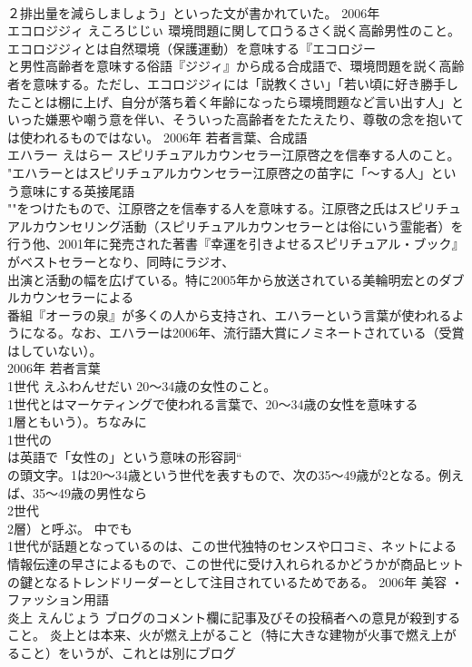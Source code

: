 \documentclass[8pt]{extreport}
\begin{document}
\begin{CJK}{UTF8}{min}
\\	２排出量を減らしましょう」といった文が書かれていた。	2006年	
\\	エコロジジィ	えころじじぃ	環境問題に関して口うるさく説く高齢男性のこと。	エコロジジィとは自然環境（保護運動）を意味する『エコロジー
\\	と男性高齢者を意味する俗語『ジジィ』から成る合成語で、環境問題を説く高齢者を意味する。ただし、エコロジジィには「説教くさい」「若い頃に好き勝手したことは棚に上げ、自分が落ち着く年齢になったら環境問題など言い出す人」といった嫌悪や嘲う意を伴い、そういった高齢者をたたえたり、尊敬の念を抱いては使われるものではない。	2006年	若者言葉、合成語	
\\	エハラー	えはらー	スピリチュアルカウンセラー江原啓之を信奉する人のこと。	"エハラーとはスピリチュアルカウンセラー江原啓之の苗字に「～する人」という意味にする英接尾語
\\	""をつけたもので、江原啓之を信奉する人を意味する。江原啓之氏はスピリチュアルカウンセリング活動（スピリチュアルカウンセラーとは俗にいう霊能者）を行う他、2001年に発売された著書『幸運を引きよせるスピリチュアル・ブック』がベストセラーとなり、同時にラジオ、
\\	出演と活動の幅を広げている。特に2005年から放送されている美輪明宏とのダブルカウンセラーによる
\\	番組『オーラの泉』が多くの人から支持され、エハラーという言葉が使われるようになる。なお、エハラーは2006年、流行語大賞にノミネートされている（受賞はしていない）。
\\	2006年	若者言葉	
\\	1世代	えふわんせだい	20～34歳の女性のこと。	
\\	1世代とはマーケティングで使われる言葉で、20～34歳の女性を意味する
\\	1層ともいう）。ちなみに
\\	1世代の
\\	は英語で「女性の」という意味の形容詞“
\\	の頭文字。1は20～34歳という世代を表すもので、次の35～49歳が2となる。例えば、35～49歳の男性なら
\\	2世代
\\	2層）と呼ぶ。 中でも
\\	1世代が話題となっているのは、この世代独特のセンスや口コミ、ネットによる情報伝達の早さによるもので、この世代に受け入れられるかどうかが商品ヒットの鍵となるトレンドリーダーとして注目されているためである。	2006年	美容 ・ ファッション用語	
\\	炎上	えんじょう	ブログのコメント欄に記事及びその投稿者への意見が殺到すること。	炎上とは本来、火が燃え上がること（特に大きな建物が火事で燃え上がること）をいうが、これとは別にブログ

\end{CJK}
\end{document}
